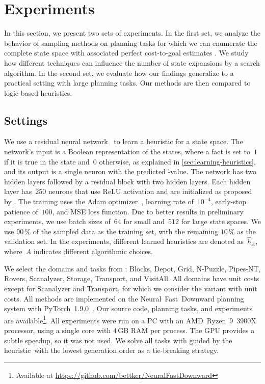 \chapter{Experiments}
\label{sec:experiments}

In this section, we present two sets of experiments. In the first set, we analyze the behavior of sampling methods on planning tasks for which we can enumerate the complete state space with associated perfect cost-to-goal estimates \hstar. We study how different techniques can influence the number of state expansions by a search algorithm. In the second set, we evaluate how our findings generalize to a practical setting with large planning tasks. Our methods are then compared to logic-based heuristics.

\section{Settings}
\label{sec:settings}

We use a residual neural network~\cite{he2016deep} to learn a heuristic for a state space. The network's input is a Boolean representation of the states, where a fact is set to~$1$ if it is true in the state and~$0$ otherwise, as explained in \cref{sec:learning-heuristics}, and its output is a single neuron with the predicted \h-value. The network has two hidden layers followed by a residual block with two hidden layers. Each hidden layer has~$250$ neurons that use ReLU activation and are initialized as proposed by \citet{he2015delving}. The training uses the Adam optimizer~\cite{kingma2015adam}, learning rate of~$10^{-4}$, early-stop patience of~$100$, and MSE loss function. Due to better results in preliminary experiments, we use batch sizes of~$64$ for small and~$512$ for large state spaces. We use $90\,\%$ of the sampled data as the training set, with the remaining $10\,\%$ as the validation set. In the experiments, different learned heuristics are denoted as~$\hat h_A$, where~$A$ indicates different algorithmic choices.

We select the domains and tasks from \citet{ferber2022neural}: Blocks, Depot, Grid, N-Puzzle, Pipes-NT, Rovers, Scanalyzer, Storage, Transport, and VisitAll. All domains have unit costs except for Scanalyzer and Transport, for which we consider the variant with unit costs. All methods are implemented on the Neural~Fast~Downward planning system with PyTorch~1.9.0~\cite{ferber2020neural,paszke2019pytorch}. Our source code, planning tasks, and experiments are available\footnote{Available at \url{https://github.com/bettker/NeuralFastDownward}}. All experiments were run on a PC with an AMD~Ryzen~9~3900X processor, using a single core with $4$\,GB RAM per process. The GPU provides a subtle speedup, so it was not used. We solve all tasks with \gbfs guided by the heuristic~\h with the lowest generation order as a tie-breaking strategy.

